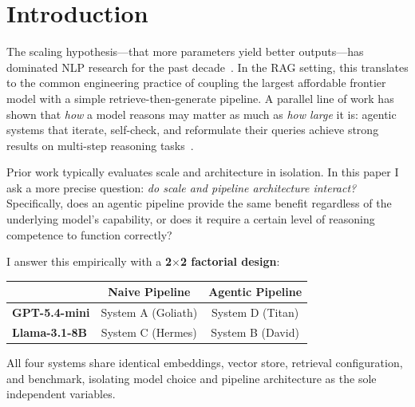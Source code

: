 \documentclass[12pt]{article}
\begin{document}
\section{Introduction}

The scaling hypothesis---that more parameters yield better outputs---has
dominated NLP research for the past decade~\cite{brown2020gpt3,kaplan2020scaling}.
In the RAG setting, this translates to the common engineering practice of
coupling the largest affordable frontier model with a simple retrieve-then-generate
pipeline.  A parallel line of work has shown that \emph{how} a model reasons
may matter as much as \emph{how large} it is: agentic systems that iterate,
self-check, and reformulate their queries achieve strong results on multi-step
reasoning tasks~\cite{yao2022react,shinn2023reflexion,asai2023selfrag}.

Prior work typically evaluates scale and architecture in isolation.  In this
paper I ask a more precise question: \emph{do scale and pipeline architecture
interact?}  Specifically, does an agentic pipeline provide the same benefit
regardless of the underlying model's capability, or does it require a certain
level of reasoning competence to function correctly?

I answer this empirically with a \textbf{2$\times$2 factorial design}:

\begin{center}
\begin{tabular}{lcc}
\toprule
 & \textbf{Naive Pipeline} & \textbf{Agentic Pipeline} \\
\midrule
\textbf{GPT-5.4-mini} & System A (Goliath) & System D (Titan) \\
\textbf{Llama-3.1-8B} & System C (Hermes)  & System B (David)  \\
\bottomrule
\end{tabular}
\end{center}

All four systems share identical embeddings, vector store, retrieval
configuration, and benchmark, isolating model choice and pipeline architecture
as the sole independent variables.
\end{document}
